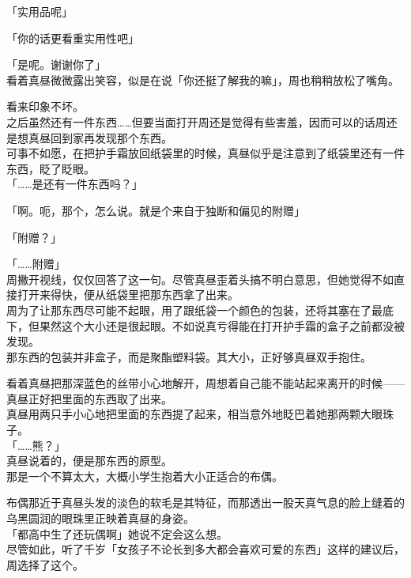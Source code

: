 「实用品呢」

「你的话更看重实用性吧」

「是呢。谢谢你了」\\

看着真昼微微露出笑容，似是在说「你还挺了解我的嘛」，周也稍稍放松了嘴角。

看来印象不坏。\\

之后虽然还有一件东西……但要当面打开周还是觉得有些害羞，因而可以的话周还是想真昼回到家再发现那个东西。\\

可事不如愿，在把护手霜放回纸袋里的时候，真昼似乎是注意到了纸袋里还有一件东西，眨了眨眼。\\

「……是还有一件东西吗？」

「啊。呃，那个，怎么说。就是个来自于独断和偏见的附赠」

「附赠？」

「……附赠」\\

周撇开视线，仅仅回答了这一句。尽管真昼歪着头搞不明白意思，但她觉得不如直接打开来得快，便从纸袋里把那东西拿了出来。\\

周为了让那东西尽可能不起眼，用了跟纸袋一个颜色的包装，还将其塞在了最底下，但果然这个大小还是很起眼。不如说真亏得能在打开护手霜的盒子之前都没被发现。\\

那东西的包装并非盒子，而是聚酯塑料袋。其大小，正好够真昼双手抱住。

看着真昼把那深蓝色的丝带小心地解开，周想着自己能不能站起来离开的时候——真昼正好把里面的东西取了出来。\\

真昼用两只手小心地把里面的东西提了起来，相当意外地眨巴着她那两颗大眼珠子。\\

「……熊？」\\

真昼说着的，便是那东西的原型。\\

那是一个不算太大，大概小学生抱着大小正适合的布偶。

布偶那近于真昼头发的淡色的软毛是其特征，而那透出一股天真气息的脸上缝着的乌黑圆润的眼珠里正映着真昼的身姿。\\

「都高中生了还玩偶啊」她说不定会这么想。\\

尽管如此，听了千岁「女孩子不论长到多大都会喜欢可爱的东西」这样的建议后，周选择了这个。\\

